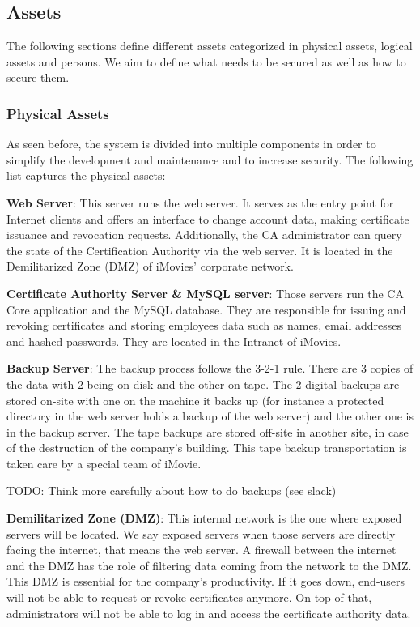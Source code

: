 \documentclass[english]{article}
\begin{document}
\subsection{Assets}
\label{assets}

The following sections define different assets categorized in physical assets, logical assets and persons. We aim to define what needs to be secured as well as how to secure them.

\subsubsection{Physical Assets}
As seen before, the system is divided into multiple components in order to simplify the development and maintenance and to increase security. The following list captures the physical assets:

\textbf{Web Server}: This server runs the web server. It serves as the entry point for Internet clients and offers an interface to change account data, making certificate issuance and revocation requests. Additionally, the CA administrator can query the state of the Certification Authority via the web server. It is located in the Demilitarized Zone (DMZ) of iMovies' corporate network.

\textbf{Certificate Authority Server \& MySQL server}: Those servers run the CA Core application and the MySQL database. They are responsible for issuing and revoking certificates and storing employees data such as names, email addresses and hashed passwords. They are located in the Intranet of iMovies.

\textbf{Backup Server}: The backup process follows the 3-2-1 rule. There are 3 copies of the data with 2 being on disk and the other on tape. The 2 digital backups are stored on-site with one on the machine it backs up (for instance a protected directory in the web server holds a backup of the web server) and the other one is in the backup server. The tape backups are stored off-site in another site, in case of the destruction of the company's building. This tape backup transportation is taken care by a special team of iMovie.

TODO: Think more carefully about how to do backups (see slack)

\textbf{Demilitarized Zone (DMZ)}: This internal network is the one where exposed servers will be located. We say exposed servers when those servers are directly facing the internet, that means the web server. A firewall between the internet and the DMZ has the role of filtering data coming from the network to the DMZ. This DMZ is essential for the company's productivity. If it goes down, end-users will not be able to request or revoke certificates anymore. On top of that, administrators will not be able to log in and access the certificate authority data.
\end{document}
